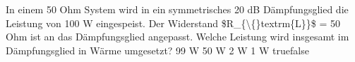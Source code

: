     {In einem 50 Ohm System wird in ein symmetrisches 20 dB Dämpfungsglied die Leistung von 100 W eingespeist. Der Widerstand \$R\_\{\textbackslash\{\}textrm\{L\}\}\$ = 50 Ohm ist an das Dämpfungsglied angepasst. Welche Leistung wird insgesamt im Dämpfungsglied in Wärme umgesetzt?}
    {99 W}
    {50 W}
    {2 W}
    {1 W}
    {true}{false}